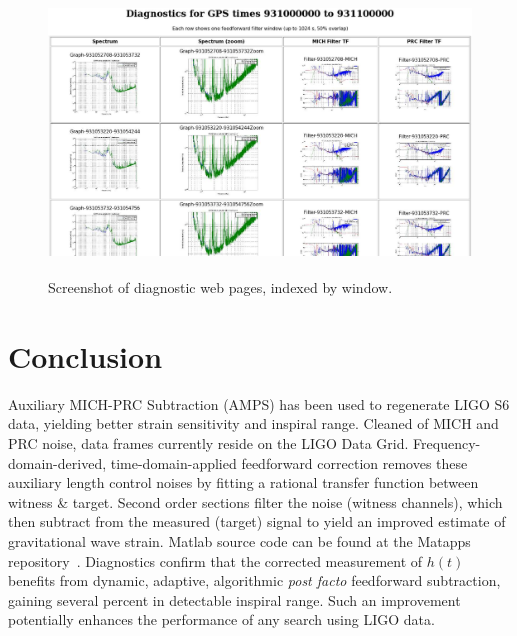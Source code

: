\begin{figure}
\begin{center}
\includegraphics[height=75mm, width=150mm]{figure16.eps}
\caption{Screenshot of diagnostic web pages, indexed by window.}
\label{diagnosticWebpages}
\end{center}
\end{figure}


\section{Conclusion}

Auxiliary MICH-PRC Subtraction (AMPS) has been used to regenerate LIGO S6 data, yielding better strain sensitivity and inspiral range. Cleaned of MICH and PRC noise, data frames currently reside on the LIGO Data Grid. Frequency-domain-derived, time-domain-applied feedforward correction removes these auxiliary length control noises by fitting a rational transfer function between witness \& target. Second order sections filter the noise (witness channels), which then subtract from the measured (target) signal to yield an improved estimate of gravitational wave strain. Matlab source code can be found at the Matapps repository~\cite{MatappsRepository}. Diagnostics confirm that the corrected measurement of $h(t)$ benefits from dynamic, adaptive, algorithmic \textit{post facto} feedforward subtraction, gaining several percent in detectable inspiral range. Such an improvement potentially enhances the performance of any search using LIGO data. 

